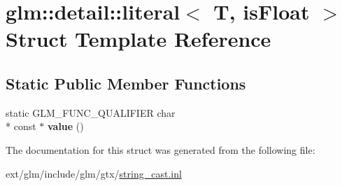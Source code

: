\hypertarget{structglm_1_1detail_1_1literal}{\section{glm\-:\-:detail\-:\-:literal$<$ T, is\-Float $>$ Struct Template Reference}
\label{structglm_1_1detail_1_1literal}
}
\subsection*{Static Public Member Functions}
\begin{DoxyCompactItemize}
\item 
\hypertarget{structglm_1_1detail_1_1literal_a14fd9d6fec8d35f7a2fd3b0095d17b6a}{static G\-L\-M\-\_\-\-F\-U\-N\-C\-\_\-\-Q\-U\-A\-L\-I\-F\-I\-E\-R char \\*
const $\ast$ {\bfseries value} ()}\label{structglm_1_1detail_1_1literal_a14fd9d6fec8d35f7a2fd3b0095d17b6a}

\end{DoxyCompactItemize}


The documentation for this struct was generated from the following file\-:\begin{DoxyCompactItemize}
\item 
ext/glm/include/glm/gtx/\hyperlink{string__cast_8inl}{string\-\_\-cast.\-inl}\end{DoxyCompactItemize}
